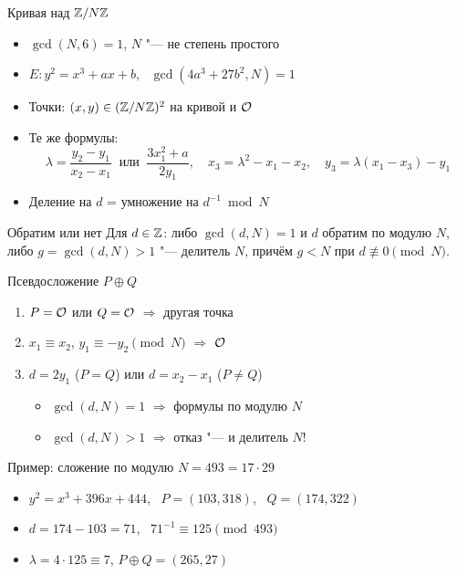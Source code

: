 \documentclass{ca-slides}
\begin{document}
\begin{canvasframe}{Кривая над $\mathbb{Z}/N\mathbb{Z}$}
  \begin{itemize}
    \item $\gcd(N, 6) = 1$, $N$ "--- не степень простого
    \item $E\colon y^2 = x^3 + ax + b$, \ $\gcd(4a^3 + 27b^2, N) = 1$
    \item Точки: $(x, y) \in (\mathbb{Z}/N\mathbb{Z})^2$ на кривой и $\mathcal{O}$
    \item Те же формулы:
      \[\lambda = \frac{y_2 - y_1}{x_2 - x_1}\ \text{ или }\ \frac{3x_1^2 + a}{2y_1},\quad
        x_3 = \lambda^2 - x_1 - x_2,\quad y_3 = \lambda(x_1 - x_3) - y_1\]
    \item Деление на $d$ = умножение на $d^{-1} \bmod N$
  \end{itemize}
\end{canvasframe}

\begin{theoremframe}[lemma]{Обратим или нет}
  Для $d \in \mathbb{Z}$: либо $\gcd(d, N) = 1$ и $d$ обратим по модулю $N$, либо
  $g = \gcd(d, N) > 1$ "--- делитель $N$, причём $g < N$ при $d \not\equiv 0 \pmod N$.
\end{theoremframe}

\begin{canvasframe}{Псевдосложение $P \oplus Q$}
  \begin{enumerate}
    \item $P = \mathcal{O}$ или $Q = \mathcal{O}$ $\Rightarrow$ другая точка
    \item $x_1 \equiv x_2$, $y_1 \equiv -y_2 \pmod N$ $\Rightarrow$ $\mathcal{O}$
    \item $d = 2y_1$ ($P = Q$) или $d = x_2 - x_1$ ($P \ne Q$)
      \begin{itemize}
        \item $\gcd(d, N) = 1$ $\Rightarrow$ формулы по модулю $N$
        \item $\gcd(d, N) > 1$ $\Rightarrow$ \alert{отказ} "--- и делитель $N$!
      \end{itemize}
  \end{enumerate}
  \penspace[0.2\textheight]
\end{canvasframe}

\begin{canvasframe}{Пример: сложение по модулю $N = 493 = 17 \cdot 29$}
  \begin{itemize}
    \item $y^2 = x^3 + 396x + 444$, \ $P = (103, 318)$, \ $Q = (174, 322)$
    \item $d = 174 - 103 = 71$, \ $71^{-1} \equiv 125 \pmod{493}$
    \item $\lambda = 4 \cdot 125 \equiv 7$, \quad $P \oplus Q = (265, 27)$
  \end{itemize}
  \penspace[0.15\textheight]
\end{canvasframe}
\end{document}
